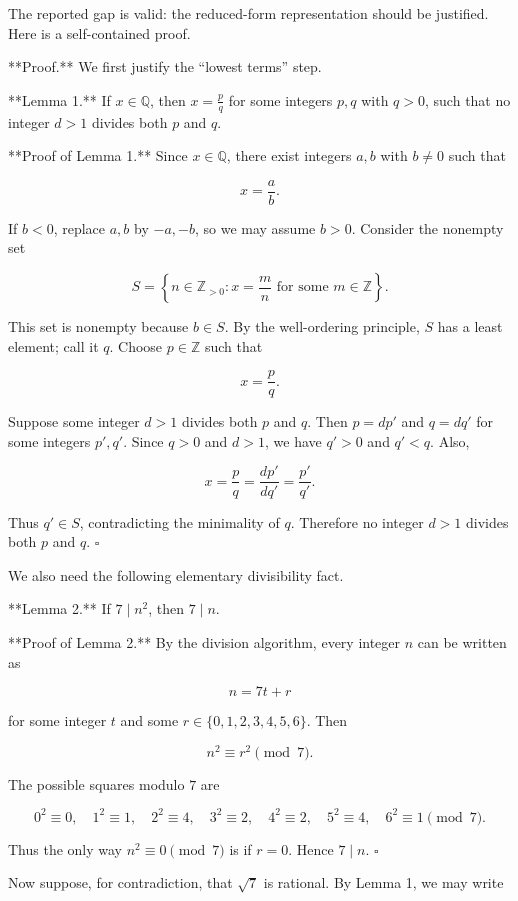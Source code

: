 The reported gap is valid: the reduced-form representation should be justified. Here is a self-contained proof.

**Proof.** We first justify the “lowest terms” step.

**Lemma 1.** If \(x\in \mathbb{Q}\), then \(x=\frac{p}{q}\) for some integers \(p,q\) with \(q>0\), such that no integer \(d>1\) divides both \(p\) and \(q\).

**Proof of Lemma 1.** Since \(x\in \mathbb{Q}\), there exist integers \(a,b\) with \(b\neq 0\) such that

\[
x=\frac{a}{b}.
\]

If \(b<0\), replace \(a,b\) by \(-a,-b\), so we may assume \(b>0\). Consider the nonempty set

\[
S=\left\{n\in \mathbb{Z}_{>0} : x=\frac{m}{n}\text{ for some }m\in \mathbb{Z}\right\}.
\]

This set is nonempty because \(b\in S\). By the well-ordering principle, \(S\) has a least element; call it \(q\). Choose \(p\in \mathbb{Z}\) such that

\[
x=\frac{p}{q}.
\]

Suppose some integer \(d>1\) divides both \(p\) and \(q\). Then \(p=dp'\) and \(q=dq'\) for some integers \(p',q'\). Since \(q>0\) and \(d>1\), we have \(q'>0\) and \(q'<q\). Also,

\[
x=\frac{p}{q}=\frac{dp'}{dq'}=\frac{p'}{q'}.
\]

Thus \(q'\in S\), contradicting the minimality of \(q\). Therefore no integer \(d>1\) divides both \(p\) and \(q\). \(\square\)

We also need the following elementary divisibility fact.

**Lemma 2.** If \(7\mid n^2\), then \(7\mid n\).

**Proof of Lemma 2.** By the division algorithm, every integer \(n\) can be written as

\[
n=7t+r
\]

for some integer \(t\) and some \(r\in \{0,1,2,3,4,5,6\}\). Then

\[
n^2 \equiv r^2 \pmod 7.
\]

The possible squares modulo \(7\) are

\[
0^2\equiv 0,\quad
1^2\equiv 1,\quad
2^2\equiv 4,\quad
3^2\equiv 2,\quad
4^2\equiv 2,\quad
5^2\equiv 4,\quad
6^2\equiv 1
\pmod 7.
\]

Thus the only way \(n^2\equiv 0\pmod 7\) is if \(r=0\). Hence \(7\mid n\). \(\square\)

Now suppose, for contradiction, that \(\sqrt{7}\) is rational. By Lemma 1, we may write

